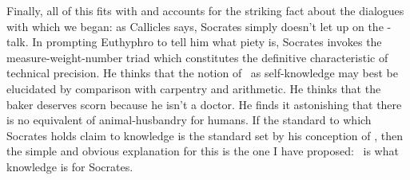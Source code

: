 \documentclass[11pt,letterpaper,oneside]{amsart} %
\begin{document}
Finally, all of this fits with and accounts for the striking fact about the dialogues with which we began: as Callicles says, Socrates simply doesn't let up on the \techne-talk. In prompting Euthyphro to tell him what piety is, Socrates invokes the measure-weight-number triad which constitutes the definitive characteristic of technical precision. He thinks that the notion of \sophrosune\ as self-knowledge may best be elucidated by comparison with carpentry and arithmetic. He thinks that the baker deserves scorn because he isn't a doctor. He finds it astonishing that there is no equivalent of animal-husbandry for humans. If the standard to which Socrates holds claim to knowledge is the standard set by his conception of \techne, then the simple and obvious explanation for this is the one I have proposed: \techne\ is what knowledge is for Socrates.











\end{document}
